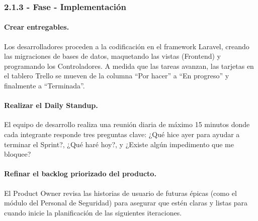 \subsubsection{2.1.3 - Fase - Implementación}

\paragraph{Crear entregables.}
Los desarrolladores proceden a la codificación en el framework Laravel, creando las migraciones de bases de datos, maquetando las vistas (Frontend) y programando los Controladores. A medida que las tareas avanzan, las tarjetas en el tablero Trello se mueven de la columna ``Por hacer'' a ``En progreso'' y finalmente a ``Terminada''. 

\paragraph{Realizar el Daily Standup.}
El equipo de desarrollo realiza una reunión diaria de máximo 15 minutos donde cada integrante responde tres preguntas clave: ¿Qué hice ayer para ayudar a terminar el Sprint?, ¿Qué haré hoy?, y ¿Existe algún impedimento que me bloquee? 

\paragraph{Refinar el backlog priorizado del producto.}
El Product Owner revisa las historias de usuario de futuras épicas (como el módulo del Personal de Seguridad) para asegurar que estén claras y listas para cuando inicie la planificación de las siguientes iteraciones.
